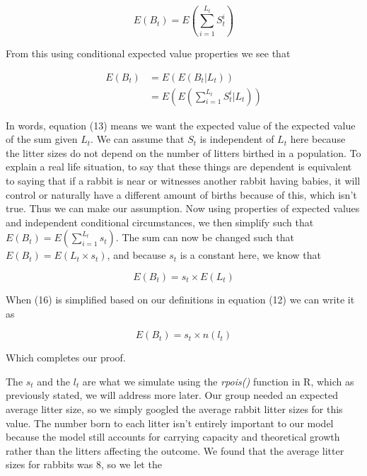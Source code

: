 \documentclass{article}\usepackage[]{graphicx}\usepackage[]{color}
\begin{document}
\begin{equation}
E(B_t) = E\left(\sum_{i=1}^{L_t} S_t^i\right)
\end{equation}

\noindent From this using conditional expected value properties we see that 

\begin{equation}
\begin{split}
E(B_t) & = E(E(B_t | L_t)) \\
& = E\left(E\left(\sum_{i=1}^{L_t} S_t^i | L_t\right)\right)
\end{split}
\end{equation}

\noindent In words, equation (13) means we want the expected value of the expected value of the sum given \(L_t\). We can assume that \(S_t\) is independent of \(L_t\) here because the litter sizes do not depend on the number of litters birthed in a population. To explain a real life situation, to say that these things are dependent is equivalent to saying that if a rabbit is near or witnesses another rabbit having babies, it will control or naturally have a different amount of births because of this, which isn't true. Thus we can make our assumption. Now using properties of expected values and independent conditional circumstances, we then simplify such that \(E(B_t) = E(\sum_{i=1}^{L_t} s_t)\). The sum can now be changed such that \(E(B_t) = E(L_t \times s_t)\), and because \(s_t\) is a constant here, we know that 

\begin{equation}
E(B_t) = s_t \times E(L_t)
\end{equation}

\noindent When (16) is simplified based on our definitions  in  equation (12) we can write it as

\begin{equation}
E(B_t) = s_t\times n(l_t)
\end{equation}

\noindent Which completes our proof. 

 The \(s_t\) and the \(l_t\) are what we simulate using the \textit{rpois()} function in R, which as previously stated, we will address more later. Our group needed an expected average litter size, so we simply googled the average rabbit litter sizes for this value. The number born to each litter isn't entirely important to our model because the model still accounts for carrying capacity and theoretical growth rather than the litters affecting the outcome. We found that the average litter sizes for rabbits was \(8\), so we let the 
\end{document}
